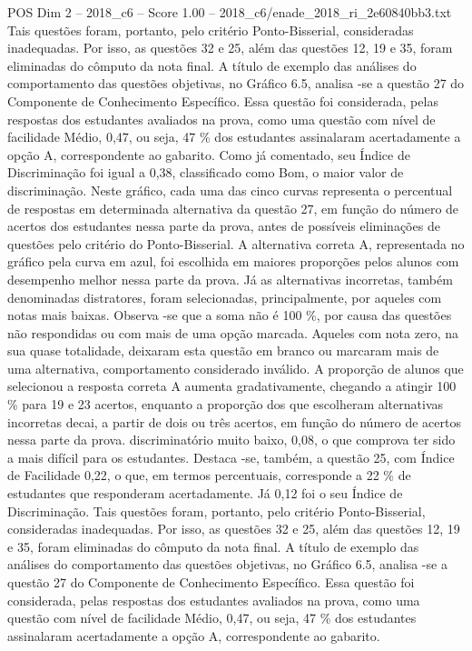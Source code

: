 \begin{textsample}{POS Dim 2 – 2018\_c6 – Score 1.00 – 2018\_c6/enade\_2018\_ri\_2e60840bb3.txt}
Tais questões foram, portanto, pelo critério Ponto-Bisserial, consideradas inadequadas.
Por isso, as questões 32 e 25, além das questões 12, 19 e 35, foram eliminadas do cômputo da nota final.
A título de exemplo das análises do comportamento das questões objetivas, no Gráfico 6.5, analisa -se a questão 27 do Componente de Conhecimento Específico.
Essa questão foi considerada, pelas respostas dos estudantes avaliados na prova, como uma questão com nível de facilidade Médio, 0,47, ou seja, 47 \% dos estudantes assinalaram acertadamente a opção A, correspondente ao gabarito.
Como já comentado, seu Índice de Discriminação foi igual a 0,38, classificado como Bom, o maior valor de discriminação.
Neste gráfico, cada uma das cinco curvas representa o percentual de respostas em determinada alternativa da questão 27, em função do número de acertos dos estudantes nessa parte da prova, antes de possíveis eliminações de questões pelo critério do Ponto-Bisserial.
A alternativa correta A, representada no gráfico pela curva em azul, foi escolhida em maiores proporções pelos alunos com desempenho melhor nessa parte da prova.
Já as alternativas incorretas, também denominadas distratores, foram selecionadas, principalmente, por aqueles com notas mais baixas.
Observa -se que a soma não é 100 \%, por causa das questões não respondidas ou com mais de uma opção marcada.
Aqueles com nota zero, na sua quase totalidade, deixaram esta questão em branco ou marcaram mais de uma alternativa, comportamento considerado inválido.
A proporção de alunos que selecionou a resposta correta A aumenta gradativamente, chegando a atingir 100 \% para 19 e 23 acertos, enquanto a proporção dos que escolheram alternativas incorretas decai, a partir de dois ou três acertos, em função do número de acertos nessa parte da prova. discriminatório muito baixo, 0,08, o que comprova ter sido a mais difícil para os estudantes.
Destaca -se, também, a questão 25, com Índice de Facilidade 0,22, o que, em termos percentuais, corresponde a 22 \% de estudantes que responderam acertadamente.
Já 0,12 foi o seu Índice de Discriminação.
Tais questões foram, portanto, pelo critério Ponto-Bisserial, consideradas inadequadas.
Por isso, as questões 32 e 25, além das questões 12, 19 e 35, foram eliminadas do cômputo da nota final.
A título de exemplo das análises do comportamento das questões objetivas, no Gráfico 6.5, analisa -se a questão 27 do Componente de Conhecimento Específico.
Essa questão foi considerada, pelas respostas dos estudantes avaliados na prova, como uma questão com nível de facilidade Médio, 0,47, ou seja, 47 \% dos estudantes assinalaram acertadamente a opção A, correspondente ao gabarito.

\end{textsample}
